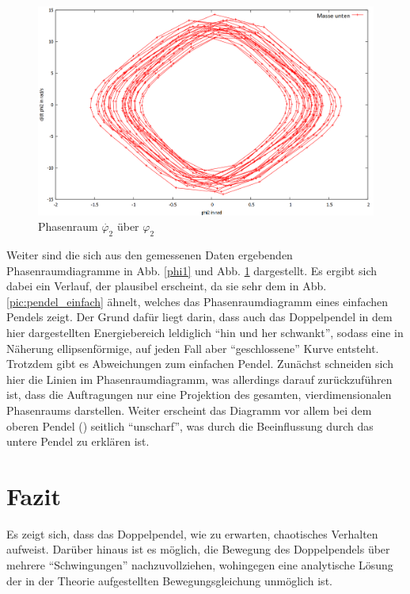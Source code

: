 \begin{figure}
        \includegraphics[width=.9\textwidth]{images/phi2_ueberphi2_neu.png}
\caption{Phasenraum $\dot{\varphi_2} $ über $\varphi_2$}
\label{phi2}
\end{figure}

Weiter sind die sich aus den gemessenen Daten ergebenden Phasenraumdiagramme in Abb. \ref{phi1} und Abb. \ref{phi2} dargestellt. Es ergibt sich dabei ein Verlauf, der plausibel erscheint, da sie sehr dem in Abb. \ref{pic:pendel_einfach} ähnelt, welches das Phasenraumdiagramm eines einfachen Pendels zeigt. Der Grund dafür liegt darin, dass auch das Doppelpendel in dem hier dargestellten Energiebereich leldiglich \enquote{hin und her schwankt}, sodass eine in Näherung ellipsenförmige, auf jeden Fall aber \enquote{geschlossene} Kurve entsteht. \\
Trotzdem gibt es Abweichungen zum einfachen Pendel. Zunächst schneiden sich hier die Linien im Phasenraumdiagramm, was allerdings darauf zurückzuführen ist, dass die Auftragungen nur eine Projektion des gesamten, vierdimensionalen Phasenraums darstellen. Weiter erscheint das Diagramm vor allem bei dem oberen Pendel () seitlich \enquote{unscharf}, was durch die Beeinflussung durch das untere Pendel zu erklären ist. 

\section{Fazit}
Es zeigt sich, dass das Doppelpendel, wie zu erwarten, chaotisches Verhalten aufweist. Darüber hinaus ist es möglich, die Bewegung des Doppelpendels über mehrere \enquote{Schwingungen} nachzuvollziehen, wohingegen eine analytische Lösung der in der Theorie aufgestellten Bewegungsgleichung unmöglich ist. 